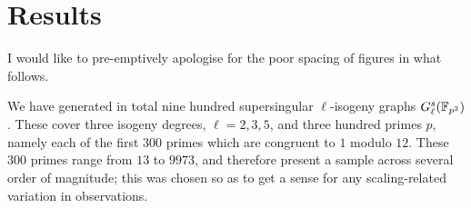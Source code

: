 \chapter{Results}\label{ch:results}
    \begin{remark}
        I would like to pre-emptively apologise for the poor spacing of figures in what follows. 
    \end{remark}

    We have generated in total nine hundred supersingular $\ell$-isogeny graphs $G_\ell^s(\mathbb{F}_{p^2})$. These cover three isogeny degrees, $\ell = 2,3,5$, and three hundred primes $p$, namely each of the first $300$ primes which are congruent to $1$ modulo $12$. These $300$ primes range from $13$ to $9973$, and therefore present a sample across several order of magnitude; this was chosen so as to get a sense for any scaling-related variation in observations.

